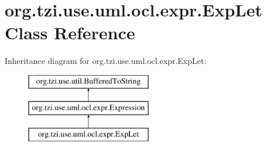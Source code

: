 \hypertarget{classorg_1_1tzi_1_1use_1_1uml_1_1ocl_1_1expr_1_1_exp_let}{\section{org.\-tzi.\-use.\-uml.\-ocl.\-expr.\-Exp\-Let Class Reference}
\label{classorg_1_1tzi_1_1use_1_1uml_1_1ocl_1_1expr_1_1_exp_let}
}
Inheritance diagram for org.\-tzi.\-use.\-uml.\-ocl.\-expr.\-Exp\-Let\-:\begin{figure}[H]
\begin{center}
\leavevmode
\includegraphics[height=3.000000cm]{classorg_1_1tzi_1_1use_1_1uml_1_1ocl_1_1expr_1_1_exp_let}
\end{center}
\end{figure}
